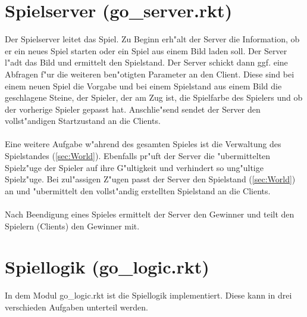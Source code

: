 \documentclass[a4paper]{scrreprt}
\begin{document}
\section{Spielserver (go\_server.rkt)}
Der Spielserver leitet das Spiel. Zu Beginn erh"alt der Server die Information, ob er ein neues Spiel starten oder ein Spiel aus einem Bild laden soll. Der Server l"adt das Bild und ermittelt den Spielstand. Der Server schickt dann ggf. eine Abfragen f"ur die weiteren ben"otigten Parameter an den Client. Diese sind bei einem neuen Spiel die Vorgabe und bei einem Spielstand aus einem Bild die geschlagene Steine, der Spieler, der am Zug ist, die Spielfarbe des Spielers und ob der vorherige Spieler gepasst hat. Anschlie"send sendet der Server den vollst"andigen Startzustand an die Clients.\\\\
Eine weitere Aufgabe w"ahrend des gesamten Spieles ist die Verwaltung des Spielstandes (\ref{sec:World}). Ebenfalls pr"uft der Server die "ubermittelten Spielz"uge der Spieler auf ihre G"ultigkeit und verhindert so ung"ultige Spielz"uge. Bei zul"assigen Z"ugen passt der Server den Spielstand (\ref{sec:World}) an und "ubermittelt den vollst"andig erstellten Spielstand an die Clients.\\\\ 
Nach Beendigung eines Spieles ermittelt der Server den Gewinner und teilt den Spielern (Clients) den Gewinner mit.

\section{Spiellogik (go\_logic.rkt)}
In dem Modul go\_logic.rkt ist die Spiellogik implementiert. Diese kann in drei verschieden Aufgaben unterteil werden.
\end{document}
